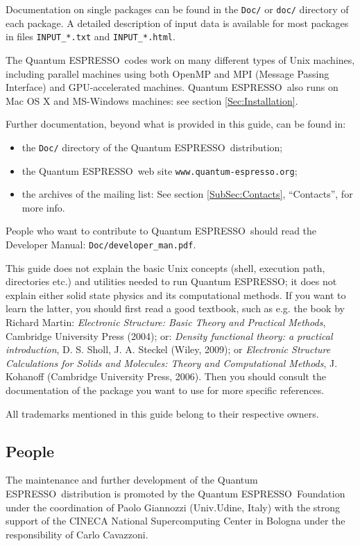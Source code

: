 \documentclass[12pt,a4paper]{article}
\def\qe{{\sc Quantum ESPRESSO}}
\begin{document}
Documentation on single packages can be found in the \texttt{Doc/} or
\texttt{doc/} directory of each package. A detailed description of input
data is available for most packages in files \texttt{INPUT\_*.txt} and
\texttt{INPUT\_*.html}.

The \qe\ codes work on many different types of Unix machines,
including parallel machines using both OpenMP and MPI
(Message Passing Interface) and GPU-accelerated machines.
\qe\ also runs on Mac OS X and MS-Windows machines:
see section \ref{Sec:Installation}.

Further documentation, beyond what is provided in this guide, can be found in:
\begin{itemize}
  \item the \texttt{Doc/} directory of the \qe\ distribution;
  \item the \qe\ web site \texttt{www.quantum-espresso.org};
  \item the archives of the  mailing list:
   See section \ref{SubSec:Contacts}, ``Contacts'', for more info.
\end{itemize}
People who want to contribute to \qe\ should read the
Developer Manual: \texttt{Doc/developer\_man.pdf}.

This guide does not explain the basic Unix concepts (shell, execution
path, directories etc.) and utilities needed to run \qe; it does not
explain either solid state physics and its computational methods.
If you want to learn the latter, you should first read a good textbook,
such as e.g. the book by Richard Martin:
{\em Electronic Structure: Basic Theory and Practical Methods},
Cambridge University Press (2004); or:
{\em Density functional theory: a practical introduction},
D. S. Sholl, J. A. Steckel (Wiley, 2009); or
{\em Electronic Structure Calculations for Solids and Molecules:
Theory and Computational Methods},
J. Kohanoff (Cambridge University Press, 2006). Then you should consult
the documentation of the package you want to use for more specific references.

All trademarks mentioned in this guide belong to their respective owners.

\subsection{People}

The maintenance and further development of the \qe\ distribution
is promoted by the \qe\ Foundation under the coordination of
Paolo Giannozzi (Univ.Udine, Italy) with the strong support
of the CINECA National Supercomputing Center in Bologna under
the responsibility of Carlo Cavazzoni.
\end{document}
